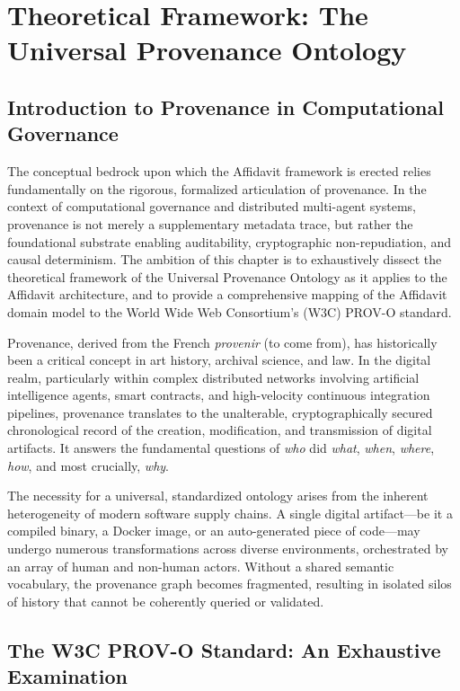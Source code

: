 \chapter{Theoretical Framework: The Universal Provenance Ontology}
\label{ch:theory_ontology}

\section{Introduction to Provenance in Computational Governance}

The conceptual bedrock upon which the Affidavit framework is erected relies fundamentally on the rigorous, formalized articulation of provenance. In the context of computational governance and distributed multi-agent systems, provenance is not merely a supplementary metadata trace, but rather the foundational substrate enabling auditability, cryptographic non-repudiation, and causal determinism. The ambition of this chapter is to exhaustively dissect the theoretical framework of the Universal Provenance Ontology as it applies to the Affidavit architecture, and to provide a comprehensive mapping of the Affidavit domain model to the World Wide Web Consortium's (W3C) PROV-O standard.

Provenance, derived from the French \textit{provenir} (to come from), has historically been a critical concept in art history, archival science, and law. In the digital realm, particularly within complex distributed networks involving artificial intelligence agents, smart contracts, and high-velocity continuous integration pipelines, provenance translates to the unalterable, cryptographically secured chronological record of the creation, modification, and transmission of digital artifacts. It answers the fundamental questions of \textit{who} did \textit{what}, \textit{when}, \textit{where}, \textit{how}, and most crucially, \textit{why}.

The necessity for a universal, standardized ontology arises from the inherent heterogeneity of modern software supply chains. A single digital artifact—be it a compiled binary, a Docker image, or an auto-generated piece of code—may undergo numerous transformations across diverse environments, orchestrated by an array of human and non-human actors. Without a shared semantic vocabulary, the provenance graph becomes fragmented, resulting in isolated silos of history that cannot be coherently queried or validated.

\section{The W3C PROV-O Standard: An Exhaustive Examination}

